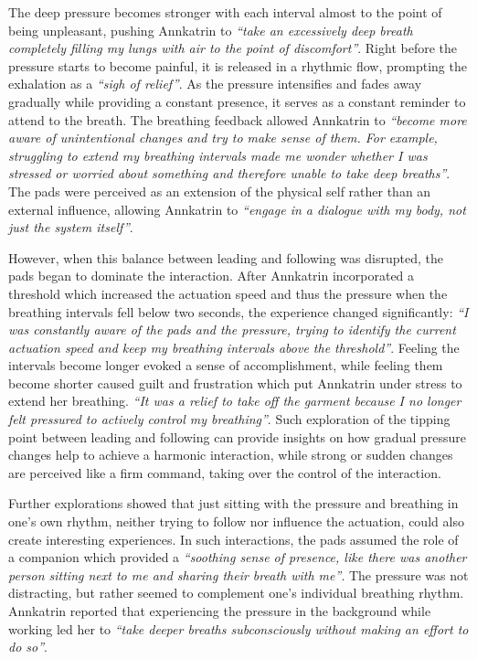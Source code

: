 The deep pressure becomes stronger with each interval almost to the point of being unpleasant, pushing Annkatrin to \textit{``take an excessively deep breath completely filling my lungs with air to the point of discomfort''}. Right before the pressure starts to become painful, it is released in a rhythmic flow, prompting the exhalation as a \textit{``sigh of relief''}. As the pressure intensifies and fades away gradually while providing a constant presence, it serves as a constant reminder to attend to the breath. The breathing feedback allowed Annkatrin to \textit{``become more aware of unintentional changes and try to make sense of them. For example, struggling to extend my breathing intervals made me wonder whether I was stressed or worried about something and therefore unable to take deep breaths''}. The pads were perceived as an extension of the physical self rather than an external influence, allowing Annkatrin to \textit{``engage in a dialogue with my body, not just the system itself''}.

However, when this balance between leading and following was disrupted, the pads began to dominate the interaction. After Annkatrin incorporated a threshold which increased the actuation speed and thus the pressure when the breathing intervals fell below two seconds, the experience changed significantly: \textit{``I was constantly aware of the pads and the pressure, trying to identify the current actuation speed and keep my breathing intervals above the threshold''}. Feeling the intervals become longer evoked a sense of accomplishment, while feeling them become shorter caused guilt and frustration which put Annkatrin under stress to extend her breathing. \textit{``It was a relief to take off the garment because I no longer felt pressured to actively control my breathing''}. Such exploration of the tipping point between leading and following can provide insights on how gradual pressure changes help to achieve a harmonic interaction, while strong or sudden changes are perceived like a firm command, taking over the control of the interaction.

Further explorations showed that just sitting with the pressure and breathing in one's own rhythm, neither trying to follow nor influence the actuation, could also create interesting experiences. In such interactions, the pads assumed the role of a companion which provided a \textit{``soothing sense of presence, like there was another person sitting next to me and sharing their breath with me''}. The pressure was not distracting, but rather seemed to complement one's individual breathing rhythm. Annkatrin reported that experiencing the pressure in the background while working led her to \textit{``take deeper breaths subconsciously without making an effort to do so''}.

